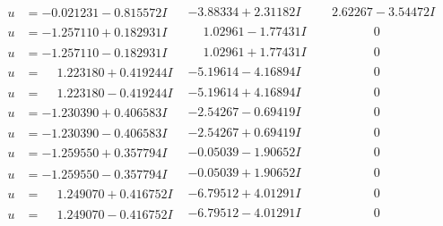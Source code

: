 \documentclass[1p]{elsarticle_modified}
\theoremstyle{definition}
\begin{document}
$$\begin{array}{c|c|c}
\begin{aligned}
u &= -0.021231 - 0.815572 I\end{aligned}
 & -3.88334 + 2.31182 I & \phantom{-}2.62267 - 3.54472 I \\ \hline\begin{aligned}
u &= -1.257110 + 0.182931 I\end{aligned}
 & \phantom{-}1.02961 - 1.77431 I & \phantom{-0.000000 } 0 \\ \hline\begin{aligned}
u &= -1.257110 - 0.182931 I\end{aligned}
 & \phantom{-}1.02961 + 1.77431 I & \phantom{-0.000000 } 0 \\ \hline\begin{aligned}
u &= \phantom{-}1.223180 + 0.419244 I\end{aligned}
 & -5.19614 - 4.16894 I & \phantom{-0.000000 } 0 \\ \hline\begin{aligned}
u &= \phantom{-}1.223180 - 0.419244 I\end{aligned}
 & -5.19614 + 4.16894 I & \phantom{-0.000000 } 0 \\ \hline\begin{aligned}
u &= -1.230390 + 0.406583 I\end{aligned}
 & -2.54267 - 0.69419 I & \phantom{-0.000000 } 0 \\ \hline\begin{aligned}
u &= -1.230390 - 0.406583 I\end{aligned}
 & -2.54267 + 0.69419 I & \phantom{-0.000000 } 0 \\ \hline\begin{aligned}
u &= -1.259550 + 0.357794 I\end{aligned}
 & -0.05039 - 1.90652 I & \phantom{-0.000000 } 0 \\ \hline\begin{aligned}
u &= -1.259550 - 0.357794 I\end{aligned}
 & -0.05039 + 1.90652 I & \phantom{-0.000000 } 0 \\ \hline\begin{aligned}
u &= \phantom{-}1.249070 + 0.416752 I\end{aligned}
 & -6.79512 + 4.01291 I & \phantom{-0.000000 } 0 \\ \hline\begin{aligned}
u &= \phantom{-}1.249070 - 0.416752 I\end{aligned}
 & -6.79512 - 4.01291 I & \phantom{-0.000000 } 0 \\ \hline\begin{aligned}

\end{aligned}
\end{array}$$
\end{document}
